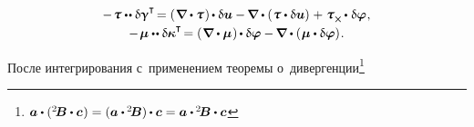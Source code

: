 \begin{otherlanguage}{russian}
\nopagebreak\vspace{-0.4em}\begin{equation*}
\begin{array}{c}
- \hspace{.2ex} \forcestresstensor \dotdotp \variation{\distortiontensor}^{\T} \hspace{-0.32ex}
= \left( \hspace{.12ex} \boldnabla \dotp \forcestresstensor \hspace{.12ex} \right) \hspace{-0.16ex} \dotp \variation{\fieldofdisplacements}
- \hspace{-0.15ex} \boldnabla \dotp \left( \hspace{.1ex} \forcestresstensor \dotp \variation{\fieldofdisplacements} \right) \hspace{.1ex}
+ \hspace{.1ex} \forcestresstensor_{\Xcompanion} \hspace{-0.1ex} \dotp \hspace{.1ex} \variation{\fieldofrotations} \hspace{.1ex} ,
\\[.25em]
%
- \hspace{.2ex} \couplestresstensor \dotdotp \variation{\wrynesstensor}^{\T} \hspace{-0.32ex}
= \left( \hspace{.12ex} \boldnabla \dotp \couplestresstensor \hspace{.12ex} \right) \hspace{-0.16ex} \dotp \variation{\fieldofrotations}
- \hspace{-0.15ex} \boldnabla \dotp \left( \hspace{.1ex} \couplestresstensor \dotp \variation{\fieldofrotations} \right) \hspace{-0.25ex} .
\end{array}
\end{equation*}

\vspace{-0.25em}\noindent
После интегрирования с~применением теоремы о~дивергенции\footnote{${\bm{a} \dotp ({^2\!\bm{B}} \dotp \bm{c} \hspace{.1ex}) = (\bm{a} \dotp \hspace{-0.12ex} {^2\!\bm{B}}) \hspace{-0.1ex} \dotp \bm{c} = \bm{a} \dotp \hspace{-0.12ex} {^2\!\bm{B}} \dotp \bm{c}}$}


\end{otherlanguage}
